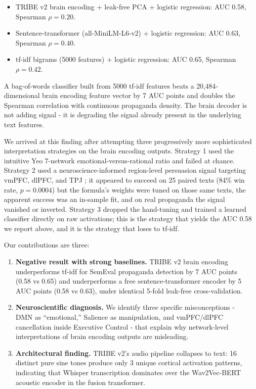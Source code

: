 \documentclass[11pt]{article}
\begin{document}
\begin{itemize}
    \item TRIBE v2 brain encoding + leak-free PCA + logistic regression: AUC 0.58, Spearman $\rho=0.20$.
    \item Sentence-transformer (all-MiniLM-L6-v2) + logistic regression: AUC 0.63, Spearman $\rho=0.40$.
    \item tf-idf bigrams (5000 features) + logistic regression: AUC 0.65, Spearman $\rho=0.42$.
\end{itemize}

A bag-of-words classifier built from 5000 tf-idf features beats a 20{,}484-dimensional brain encoding feature vector by 7 AUC points and doubles the Spearman correlation with continuous propaganda density. The brain decoder is not adding signal - it is degrading the signal already present in the underlying text features.

We arrived at this finding after attempting three progressively more sophisticated interpretation strategies on the brain encoding outputs. Strategy 1 used the intuitive Yeo 7-network \cite{yeo2011organization} emotional-versus-rational ratio and failed at chance. Strategy 2 used a neuroscience-informed region-level persuasion signal targeting vmPFC, dlPFC, and TPJ \cite{falk2010predicting,ntoumanis2024deciphering}; it appeared to succeed on 25 paired texts (84\% win rate, $p=0.0004$) but the formula's weights were tuned on those same texts, the apparent success was an in-sample fit, and on real propaganda the signal vanished or inverted. Strategy 3 dropped the hand-tuning and trained a learned classifier directly on raw activations; this is the strategy that yields the AUC 0.58 we report above, and it is the strategy that loses to tf-idf.

Our contributions are three:

\begin{enumerate}
    \item \textbf{Negative result with strong baselines.} TRIBE v2 brain encoding underperforms tf-idf for SemEval propaganda detection by 7 AUC points (0.58 vs 0.65) and underperforms a free sentence-transformer encoder by 5 AUC points (0.58 vs 0.63), under identical 5-fold leak-free cross-validation.
    \item \textbf{Neuroscientific diagnosis.} We identify three specific misconceptions - DMN as ``emotional,'' Salience as manipulation, and vmPFC/dlPFC cancellation inside Executive Control - that explain why network-level interpretations of brain encoding outputs are misleading.
    \item \textbf{Architectural finding.} TRIBE v2's audio pipeline collapses to text: 16 distinct pure sine tones produce only 3 unique cortical activation patterns, indicating that Whisper transcription dominates over the Wav2Vec-BERT acoustic encoder in the fusion transformer.
\end{enumerate}
\end{document}
